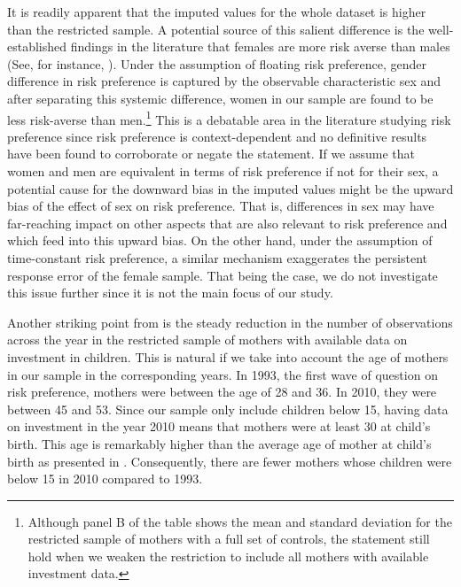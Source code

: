 \documentclass[emulatestandardclasses, 10pt, abstract = true]{scrartcl}
\begin{document}
It is readily apparent that the imputed values for the whole dataset is higher than the restricted sample. A potential source of this salient difference is the well-established findings in the literature that females are more risk averse than males (See, for instance, \citet{croson2009gender, jianakoplos1998women, powell1997gender}). Under the assumption of floating risk preference, gender difference in risk preference is captured by the observable characteristic sex and after separating this systemic difference, women in our sample are found to be less risk-averse than men.\footnote{Although panel B of the table shows the mean and standard deviation for the restricted sample of mothers with a full set of controls, the statement still hold when we weaken the restriction to include all mothers with available investment data.} This is a debatable area in the literature studying risk preference since risk preference is context-dependent and no definitive results have been found to corroborate or negate the statement. If we assume that women and men are equivalent in terms of risk preference if not for their sex, a potential cause for the downward bias in the imputed values might be the upward bias of the effect of sex on risk preference. That is, differences in sex may have far-reaching impact on other aspects that are also relevant to risk preference and which feed into this upward bias.  On the other hand, under the assumption of time-constant risk preference, a similar mechanism exaggerates the persistent response error of the female sample. That being the case, we do not investigate this issue further since it is not the main focus of our study.  

Another striking point from  is the steady reduction in the number of observations across the year in the restricted sample of mothers with available data on investment in children. This is natural if we take into account the age of mothers in our sample in the corresponding years. In 1993, the first wave of question on risk preference, mothers were between the age of 28 and 36. In 2010, they were between 45 and 53. Since our sample only include children below 15, having data on investment in the year 2010 means that mothers were at least 30 at child's birth. This age is remarkably higher than the average age of mother at child's birth as presented in . Consequently, there are fewer mothers whose children were below 15 in 2010 compared to 1993. 
\end{document}
